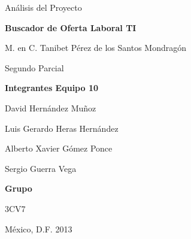 \vspace{3cm}
\centerline{\huge Análisis del Proyecto }
\vspace{0.3cm}
\centerline{\huge \bf Buscador de Oferta Laboral TI}

\vspace{2cm}

\centerline{\Large  M. en C. Tanibet Pérez de los Santos Mondragón }
\vspace{2cm}
\centerline{\Large  Segundo Parcial }

\vspace{2cm}

\centerline{\Large \bf Integrantes Equipo 10}
\vspace{0.6cm}
\centerline{\Large  David Hernández Muñoz}
\vspace{0.6cm}
\centerline{\Large  Luis Gerardo Heras Hernández}
\vspace{0.6cm}
\centerline{\Large  Alberto Xavier Gómez Ponce}
\vspace{0.6cm}
\centerline{\Large  Sergio Guerra Vega}

\vspace{0.8cm}

\centerline{\Large \bf Grupo }
\vspace{0.6cm}
\centerline{\Large  3CV7 }

\vspace{2cm}
{\large  M\'{e}xico, D.F. \hfill 2013}
